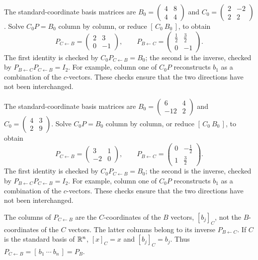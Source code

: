 The standard-coordinate basis matrices are $B_0=\begin{pmatrix}4&8\\4&4\end{pmatrix}$ and $C_0=\begin{pmatrix}2&-2\\2&2\end{pmatrix}$. Solve $C_0P=B_0$ column by column, or reduce $[\,C_0\ B_0\,]$, to obtain
\[ P_{C\leftarrow B}=\begin{pmatrix}2&3\\0&-1\end{pmatrix},\qquad P_{B\leftarrow C}=\begin{pmatrix}\frac{1}{2}&\frac{3}{2}\\0&-1\end{pmatrix}.\]
The first identity is checked by $C_0P_{C\leftarrow B}=B_0$; the second is the inverse, checked by $P_{B\leftarrow C}P_{C\leftarrow B}=I_2$. For example, column one of $C_0P$ reconstructs $b_1$ as a combination of the $c$-vectors. These checks ensure that the two directions have not been interchanged.

The standard-coordinate basis matrices are $B_0=\begin{pmatrix}6&4\\-12&2\end{pmatrix}$ and $C_0=\begin{pmatrix}4&3\\2&9\end{pmatrix}$. Solve $C_0P=B_0$ column by column, or reduce $[\,C_0\ B_0\,]$, to obtain
\[ P_{C\leftarrow B}=\begin{pmatrix}3&1\\-2&0\end{pmatrix},\qquad P_{B\leftarrow C}=\begin{pmatrix}0&- \frac{1}{2}\\1&\frac{3}{2}\end{pmatrix}.\]
The first identity is checked by $C_0P_{C\leftarrow B}=B_0$; the second is the inverse, checked by $P_{B\leftarrow C}P_{C\leftarrow B}=I_2$. For example, column one of $C_0P$ reconstructs $b_1$ as a combination of the $c$-vectors. These checks ensure that the two directions have not been interchanged.

The columns of $P_{C\leftarrow B}$ are the $C$-coordinates of the $B$
vectors, $[b_j]_C$, not the $B$-coordinates of the $C$ vectors.
The latter columns belong to its inverse $P_{B\leftarrow C}$.
If $C$ is the standard basis of $\mathbb{R}^n$, $[x]_C=x$ and
$[b_j]_C=b_j$. Thus $P_{C\leftarrow B}=[\,b_1\ \cdots\ b_n\,]=P_B$.

